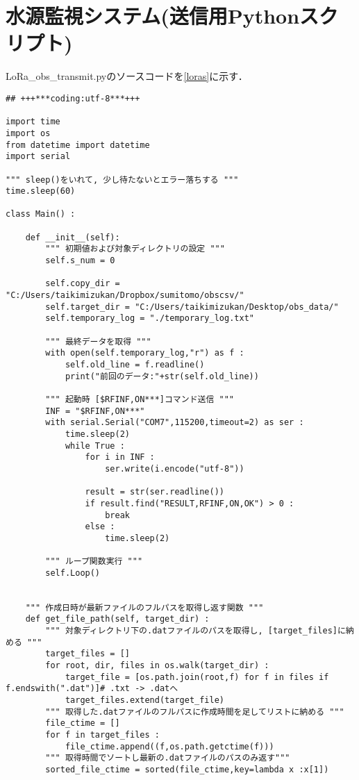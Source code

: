 \section{水源監視システム(送信用Pythonスクリプト)}
\centering
LoRa\_obs\_transmit.pyのソースコードを\ref{loras}に示す．
\begin{lstlisting}[label=loras,caption=LoRa\_obs\_transmit.py]
## +++***coding:utf-8***+++

import time
import os
from datetime import datetime
import serial

""" sleep()をいれて, 少し待たないとエラー落ちする """
time.sleep(60)

class Main() :
    
    def __init__(self):
        """ 初期値および対象ディレクトリの設定 """
        self.s_num = 0

        self.copy_dir = "C:/Users/taikimizukan/Dropbox/sumitomo/obscsv/" 
        self.target_dir = "C:/Users/taikimizukan/Desktop/obs_data/"              
        self.temporary_log = "./temporary_log.txt"

        """ 最終データを取得 """
        with open(self.temporary_log,"r") as f :
            self.old_line = f.readline()
            print("前回のデータ:"+str(self.old_line))
               
        """ 起動時 [$RFINF,ON***]コマンド送信 """
        INF = "$RFINF,ON***"
        with serial.Serial("COM7",115200,timeout=2) as ser :
            time.sleep(2)
            while True :
                for i in INF :
                    ser.write(i.encode("utf-8"))

                result = str(ser.readline())
                if result.find("RESULT,RFINF,ON,OK") > 0 :
                    break
                else :
                    time.sleep(2)

        """ ループ関数実行 """
        self.Loop()
        

    """ 作成日時が最新ファイルのフルパスを取得し返す関数 """
    def get_file_path(self, target_dir) : 
        """ 対象ディレクトリ下の.datファイルのパスを取得し, [target_files]に納める """
        target_files = []
        for root, dir, files in os.walk(target_dir) :
            target_file = [os.path.join(root,f) for f in files if f.endswith(".dat")]# .txt -> .datへ
            target_files.extend(target_file)
        """ 取得した.datファイルのフルパスに作成時間を足してリストに納める """
        file_ctime = []
        for f in target_files :
            file_ctime.append((f,os.path.getctime(f)))        
        """ 取得時間でソートし最新の.datファイルのパスのみ返す"""
        sorted_file_ctime = sorted(file_ctime,key=lambda x :x[1])
                           

\end{lstlisting}
